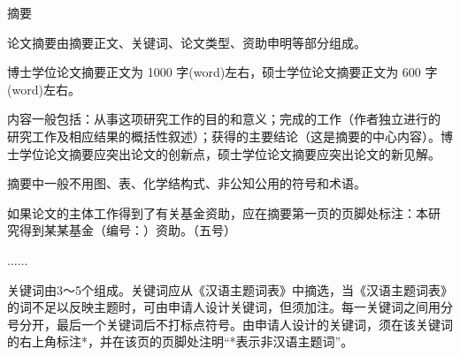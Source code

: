\documentclass[UTF8, scheme=chinese, openany, oneside]{ctexbook}
\begin{document}
\noindent{}

\vfill


\clearpage
\frontmatter
\thispagestyle{doublelinestyle} %
\pagestyle{doublelinestyle}

\begin{center}
    \vspace*{0.05cm} %
    {\sffamily 摘\quad 要}
\end{center}
\vspace{0.6cm} %

{\kaishu %
论文摘要由摘要正文、关键词、论文类型、资助申明等部分组成。

博士学位论文摘要正文为 1000 字(word)左右，硕士学位论文摘要正文为 600 字(word)左右。

内容一般包括：从事这项研究工作的目的和意义；完成的工作（作者独立进行的
研究工作及相应结果的概括性叙述）；获得的主要结论（这是摘要的中心内容）。博
士学位论文摘要应突出论文的创新点，硕士学位论文摘要应突出论文的新见解。

摘要中一般不用图、表、化学结构式、非公知公用的符号和术语。

如果论文的主体工作得到了有关基金资助，应在摘要第一页的页脚处标注：本研
究得到某某基金（编号：）资助。（五号）
}

\vspace{1.58cm}
\begin{center}
    $\dots\dots$
\end{center}
\vspace{1.58cm}


\vspace{0.3cm}

{
\noindent\hspace{2em}关键词由3～5个组成。关键词应从《汉语主题词表》中摘选，当《汉语主题词表》的词不足以反映主题时，可由申请人设计关键词，但须加注。每一关键词之间用分号分开，最后一个关键词后不打标点符号。由申请人设计的关键词，须在该关键词的右上角标注*，并在该页的页脚处注明“*表示非汉语主题词”。
}
\end{document}
